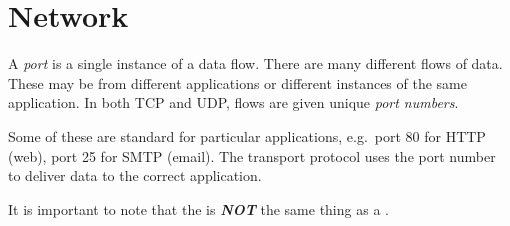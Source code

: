 \section{Network}\label{subsec:Network}
\begin{definition}[Port]\label{def:Network_Port}
  A \emph{port} is a single instance of a data flow.
  There are many different flows of data.
  These may be from different applications or different instances of the same application.
  In both TCP and UDP, flows are given unique \emph{port numbers}.

  Some of these are standard for particular applications, e.g.\ port 80 for HTTP (web), port 25 for SMTP (email).
  The transport protocol uses the port number to deliver data to the correct application.

  \begin{remark}\label{rmk:Network_Port_Confusion}
    It is important to note that the  is \textbf{\emph{NOT}} the same thing as a .
  \end{remark}
\end{definition}
